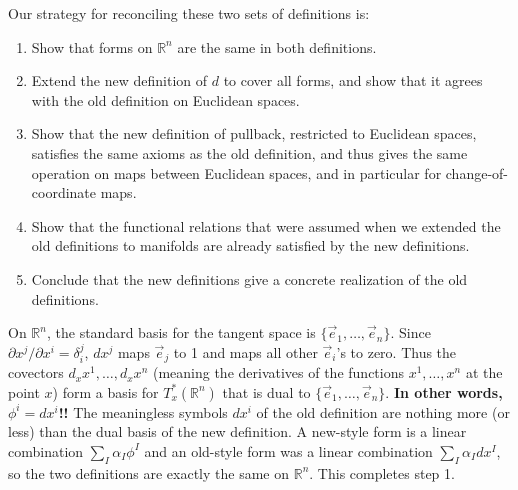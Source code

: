 \documentclass[12pt]{amsbook}
\newcommand{\R}{{\mathbb R}}
\theoremstyle{definition}
\begin{document}
\bigskip

Our strategy for reconciling these two sets of definitions is:
\begin{enumerate}
\item Show that forms on $\R^n$ are the same in both definitions. 
\item Extend the new definition of $d$ to cover all forms, and show that it
agrees with the old definition on Euclidean spaces.
\item Show that the new definition of pullback, restricted to
  Euclidean spaces, satisfies the same axioms as the old definition,
  and thus gives the same operation on maps between Euclidean spaces,
  and in particular for change-of-coordinate maps.
\item Show that the functional relations that were assumed when we extended
the old definitions to manifolds are already satisfied by the new definitions.
\item Conclude that the new definitions give a concrete realization of the 
old definitions. 
\end{enumerate}

On $\R^n$, the standard basis for the tangent space is $\{\vec e_1,
\ldots, \vec e_n\}$. Since $\partial x^j/\partial x^i = 
\delta_i^j$, $dx^j$ maps
$\vec e_j$ to 1 and maps all other $\vec e_i$'s to zero. Thus the
covectors $d_xx^1, \ldots, d_xx^n$ (meaning the derivatives of the
functions $x^1, \ldots, x^n$ at the point $x$) form a basis for
$T_x^*(\R^n)$ that is dual to $\{\vec e_1,\ldots,\vec e_n\}$. {\bf In
  other words, $\phi^i = dx^i$!!}  The meaningless symbols $dx^i$ of
the old definition are nothing more (or less) than the dual basis of
the new definition. A new-style form is a linear combination $\sum_I
\alpha_I \phi^I$ and an old-style form was a linear combination
$\sum_I \alpha_I dx^I$, so the two definitions are exactly 
the same on $\R^n$. This completes step 1.
\end{document}
